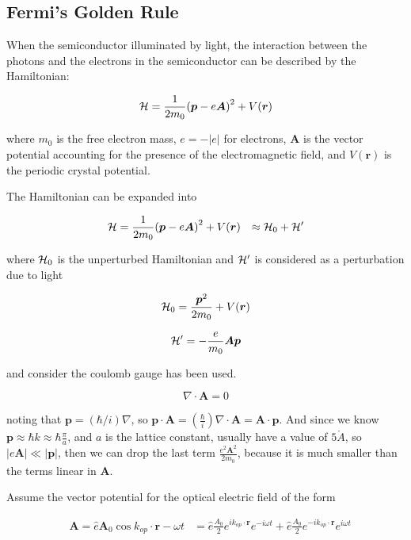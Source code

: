 \subsection{Fermi's Golden Rule} \label{GoldenRule}

When the semiconductor illuminated by light, the interaction between the photons and the electrons in the semiconductor can be described by the Hamiltonian:

\begin{equation}
  \mathcal{H} = \frac{1}{2m_0}{(\bm{p}-e\bm{A})}^2+V(\bm{r})
\end{equation}

where $m_0$ is the free electron mass, $e=-|e|$ for electrons, $\bm{A}$ is the vector potential accounting for the presence of the electromagnetic field, and $V(\bm{r})$ is the periodic crystal potential.

The Hamiltonian can be expanded into

\begin{eqnarray}
  & \mathcal{H} = \frac{1}{2m_0}{(\bm{p}-e\bm{A})}^2+V(\bm{r})
  &  \approx \mathcal{H}_0+\mathcal{H}^\prime
\end{eqnarray}

where $\mathcal{H}_0$ is the unperturbed Hamiltonian and ${\mathcal{H}}^\prime$ is considered as a perturbation due to light

\begin{equation}
\mathcal{H}_0=\frac{{\bm{p}}^2}{2m_0}+V(\bm{r})
\end{equation}

\begin{equation}
  \mathcal{H}^\prime=-\frac{e}{m_0}\bm{A}\bm{p}
\end{equation}

and consider the coulomb gauge has been used.

\begin{equation}
  \nabla\cdot\bm{A}=0
\end{equation}

noting that $\bm{p}=(\hbar/i)\nabla$, so $\bm{p}\cdot\bm{A}=(\frac{\hbar}{i})\nabla\cdot\bm{A}=\bm{A}\cdot\bm{p}$. And since we know $\bm{p}\approx\hbar{k}\approx\hbar\frac{\pi}{a}$, and $a$ is the lattice constant, usually have a value of $5\mathring{A}$, so $|e\bm{A}|\ll|\bm{p}|$, then we can drop the last term $\frac{e^2{\bm{A}}^2}{2m_0}$, because it is much smaller than the terms linear in $\bm{A}$.

Assume the vector potential for the optical electric field of the form

\begin{eqnarray}
  & \bm{A} = \hat{e}\bm{A}_0\cos{k_{op}\cdot\bm{r}-\omega{t}}
  & = \hat{e}\frac{A_0}{2}e^{ik_{op}\cdot\bm{r}}e^{-i\omega{t}} + \hat{e}\frac{A_0}{2}e^{-ik_{op}\cdot\bm{r}}e^{i\omega{t}}
\end{eqnarray}

